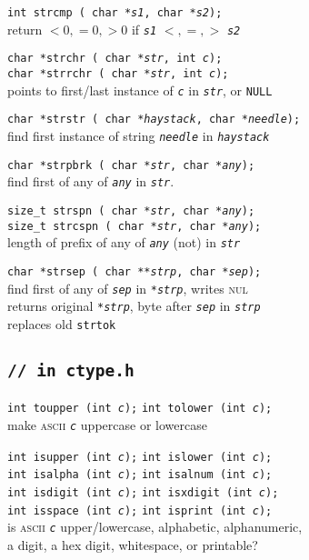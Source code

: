 \documentclass[8pt]{article}
\newcommand{\Cc}[1]{\texttt{#1}}
\newcommand{\cmt}[1]{\textcolor[gray]{.3}{\texttt{#1}}} %
\newcommand{\ty}[1]{\textcolor{blue!80}{\texttt{#1}}} %
\newcommand{\kv}[1]{\textcolor{red!40!black}{\texttt{#1}}} %
\newcommand{\fn}[1]{\texttt{#1}} %
\newcommand{\var}[1]{\texttt{\textit{#1}}} %
\newcommand{\htab}{\hspace*{2em}} %
\begin{document}
\begin{multicols}{3}
\Cc{\ty{int} \fn{strcmp}\,(%
    \ty{char *}\var{s1}, %
    \ty{char *}\var{s2}); }\\
\htab return $<0,=0,>0$ if \var{s1} $<,=,>$ \var{s2}

\Cc{\ty{char *}\fn{strchr}\,(%
    \ty{char *}\var{str}, %
    \ty{int} \var{c});} \\
\Cc{\ty{char *}\fn{strrchr}\,(%
    \ty{char *}\var{str}, %
    \ty{int} \var{c});} \\
\htab points to first/last instance of \var{c} in \var{str}, or \kv{NULL}

\Cc{\ty{char *}\fn{strstr}\,(%
    \ty{char *}\var{haystack}, %
    \ty{char *}\var{needle});} \\
\htab find first instance of string \var{needle} in \var{haystack}

\Cc{\ty{char *}\fn{strpbrk}\,(%
    \ty{char *}\var{str},
    \ty{char *}\var{any}); } \\
\htab find first of any of \var{any} in \var{str}.

\Cc{\ty{size\_t} \fn{strspn}\,(%
    \ty{char *}\var{str},
    \ty{char *}\var{any}); } \\
\Cc{\ty{size\_t} \fn{strcspn}\,(%
    \ty{char *}\var{str},
    \ty{char *}\var{any}); } \\
\htab length of prefix of any of \var{any} (not) in \var{str}

\Cc{\ty{char *}\fn{strsep}\,(%
    \ty{char **}\var{strp}, %
    \ty{char *}\var{sep});} \\
\htab find first of any of \var{sep} in \var{*strp}, writes \textsc{nul} \\
\htab returns original \var{*strp}, byte after \var{sep} in \var{strp} \\
\htab replaces old \fn{strtok}
\subsection*{\Cc{\cmt{// in ctype.h}}}

\Cc{\ty{int} \fn{toupper}\,(\ty{int} \var{c});} \hfill
\Cc{\ty{int} \fn{tolower}\,(\ty{int} \var{c});} \\
\htab make \textsc{ascii} \var{c} uppercase or lowercase

\Cc{\ty{int} \fn{isupper}\,(\ty{int} \var{c});} \hfill
\Cc{\ty{int} \fn{islower}\,(\ty{int} \var{c});} \\
\Cc{\ty{int} \fn{isalpha}\,(\ty{int} \var{c});} \hfill
\Cc{\ty{int} \fn{isalnum}\,(\ty{int} \var{c});} \\
\Cc{\ty{int} \fn{isdigit}\,(\ty{int} \var{c});} \hfill
\Cc{\ty{int} \fn{isxdigit}\,(\ty{int} \var{c});} \\
\Cc{\ty{int} \fn{isspace}\,(\ty{int} \var{c});} \hfill
\Cc{\ty{int} \fn{isprint}\,(\ty{int} \var{c});} \\
\htab is \textsc{ascii} \var{c} upper/lowercase, alphabetic, alphanumeric, \\
\htab a digit, a hex digit, whitespace, or printable?


\end{multicols}
\end{document}
